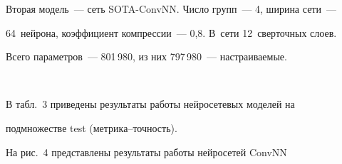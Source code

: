   Вторая модель~--- сеть SOTA-ConvNN. Число групп~--- 4, ширина сети~--- 


64~нейрона, коэффициент компрессии~--- 0,8. В~сети 12~сверточных слоев. 


Всего параметров~--- 801\,980, из них 797\,980~--- настраиваемые.





\pagebreak





\





\vspace*{-12pt}













  


  В табл.~3 приведены результаты работы нейросетевых моделей на 


под\-мно\-же\-ст\-ве test (мет\-ри\-ка--точ\-ность).


  


  


  


   


  


  На рис.~4 представлены результаты работы нейросетей \mbox{ConvNN}  



